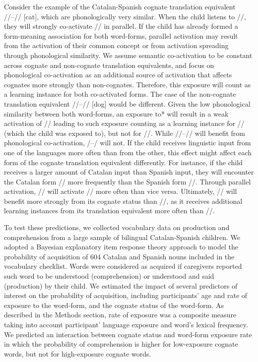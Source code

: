 \documentclass[
  12pt,
  b5paperpaper,
  twoside]{scrreprt}
\begin{document}
Consider the example of the Catalan-Spanish cognate translation
equivalent //--// {[}cat{]}, which are
phonologically very similar. When the child listens to //,
they will strongly co-activate // in parallel. If the
child has already formed a form-meaning association for both word-forms,
parallel activation may result from the activation of their common
concept or from activation spreading through phonological similarity. We
assume semantic co-activation to be constant across cognate and
non-cognate translation equivalents, and focus on phonological
co-activation as an additional source of activation that affects
cognates more strongly than non-cognates. Therefore, this exposure will
count as a learning instance for both co-activated forms. The case of
the non-cognate translation equivalent
//--// {[}dog{]} would be different. Given
the low phonological similarity between both word-forms, an exposure to*
 will result in a weak activation of //
leading to such exposure counting as a learning instance for
// (which the child was exposed to), but not for
//. While //--// will
benefit from phonological co-activation,
/--/ will not. If the child receives
linguistic input from one of the languages more often than from the
other, this effect might affect each form of the cognate translation
equivalent differently. For instance, if the child receives a larger
amount of Catalan input than Spanish input, they will encounter the
Catalan form // more frequently than the Spanish form
//. Through parallel activation, // will
activate // more often than vice versa. Ultimately,
// will benefit more strongly from its cognate status
than //, as it receives additional learning instances from
its translation equivalent more often than //.

To test these predictions, we collected vocabulary data on production
and comprehension from a large sample of bilingual Catalan-Spanish
children. We adopted a Bayesian explanatory item response theory
approach to model the probability of acquisition of 604 Catalan and
Spanish nouns included in the vocabulary checklist. Words were
considered as acquired if caregivers reported such word to be understood
(comprehension) or understood and said (production) by their child. We
estimated the impact of several predictors of interest on the
probability of acquisition, including participants' age and rate of
exposure to the word-form, and the cognate status of the word-form. As
described in the Methods section, rate of exposure was a composite
measure taking into account participant' language exposure and word's
lexical frequency. We predicted an interaction between cognate status
and word-form exposure rate in which the probability of comprehension is
higher for low-exposure cognate words, but not for high-exposure cognate
words.
\end{document}
